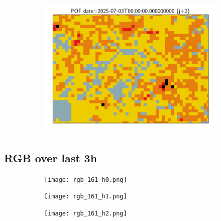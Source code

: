 \documentclass{article}
\begin{document}
\begin{figure}[H]
\begin{subfigure}[b]{0.31\textwidth}
    \end{subfigure}
    \begin{subfigure}[b]{0.36\textwidth}
        \centering
        \includegraphics[width=0.85\linewidth]{pof_161_j2.png} %
    \end{subfigure}
\end{figure}


\vspace{-1em}
\subsection*{RGB over last 3h}
\vspace{-1em}
\begin{figure}[H]
    \centering
    \begin{subfigure}[b]{0.32\textwidth}
        \centering
        \texttt{[image: rgb\_161\_h0.png]} %
    \end{subfigure}
    \begin{subfigure}[b]{0.32\textwidth}
        \centering
        \texttt{[image: rgb\_161\_h1.png]} %
    \end{subfigure}
    \begin{subfigure}[b]{0.32\textwidth}
        \centering
        \texttt{[image: rgb\_161\_h2.png]} %
    \end{subfigure}
\end{figure}
\end{document}
